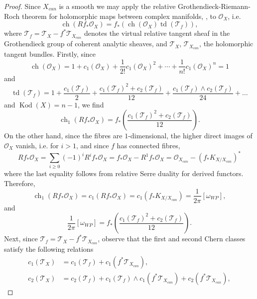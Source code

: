 \documentclass[12pt]{article}
\numberwithin{equation}{section}
\newcommand{\OO}{\mathcal{O}}
\newcommand{\T}{\mathcal{T}}
\DeclareMathOperator{\Kod}{Kod}
\DeclareMathOperator{\ch}{ch}
\DeclareMathOperator{\td}{td}
\begin{document}
\begin{proof}
Since $X_{can}$ is a smooth we may apply the relative Grothendieck-Riemann-Roch theorem for holomorphic maps between complex manifolds, \cite{BTT85}, to $\OO_X$, i.e.
\begin{equation*}
    \ch(Rf_* \OO_X) = f_* (\ch(\OO_X)\td(\T_{f})),
\end{equation*}
where $\T_f = \T_X - f^* \T_{X_{can}}$ denotes the virtual relative tangent sheaf in the Grothendieck group of coherent analytic sheaves, and $\T_X$, $\T_{X_{can}}$, the holomorphic tangent bundles. Firstly, since
\begin{equation*}
    \ch(\OO_X) = 1 + c_1(\OO_X) + \frac{1}{2!} c_1(\OO_X)^2 + \cdots + \frac{1}{n!} c_1(\OO_X)^n = 1
\end{equation*}
and 
\begin{equation*}
    \td(\T_f) = 1 + \frac{c_1(\T_f)}{2} + \frac{c_1(\T_f)^2 + c_2(\T_f)}{12} +  \frac{c_1(\T_f) \wedge c_2(\T_f)}{24} + \dots
\end{equation*}
and $\Kod(X) = n-1$, we find
\begin{equation*}
    \ch_1(R f_* \OO_X) = f_* \left(\frac{c_1(\T_f)^2 + c_2(\T_f)}{12}\right).
\end{equation*}
On the other hand, since the fibres are $1$-dimensional, the higher direct images of $\OO_X$ vanish, i.e. for $i > 1$, and since $f$ has connected fibres,
\begin{equation*}
    Rf_* \OO_X = \sum_{i \geq 0} (-1)^i R^i f_* \OO_X = f_* \OO_X - R^1 f_* \OO_X = \OO_{X_{can}} - (f_*K_{X/X_{can}})^*
\end{equation*}
where the last equality follows from relative Serre duality for derived functors. Therefore,
\begin{equation*}
    \ch_1(R f_* \OO_X) = c_1(R f_* \OO_X) = c_1(f_* K_{X/X_{can}}) = \frac{1}{2\pi}[\omega_{WP}],
\end{equation*}
and
\begin{equation*}
    \frac{1}{2\pi} [\omega_{WP}] = f_* \left(\frac{c_1(\T_f)^2 + c_2(\T_f)}{12}\right).
\end{equation*}
Next, since $\T_f = \T_X - f^*\T_{X_{can}}$, observe that the first and second Chern classes satisfy the following relations
\begin{align*}
    c_1(\T_X) &= c_1(\T_f) + c_1(f^* \T_{X_{can}}),\\
    c_2(\T_X) &= c_2(\T_f)+ c_1(\T_f) \wedge c_1 (f^* \T_{X_{can}}) + c_2(f^* \T_{X_{can}}),
\end{align*}

\end{proof}
\end{document}
